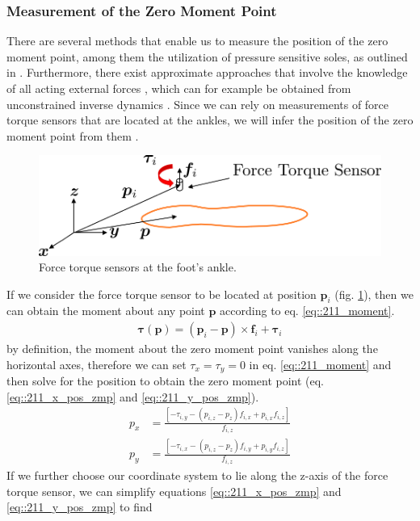 \subsubsection{Measurement of the Zero Moment Point}
There are several methods that enable us to measure the position of the zero moment point, among them the utilization of pressure sensitive soles, as outlined in \cite{kajita2014introduction}. Furthermore, there exist approximate approaches that involve the knowledge of all acting external forces \cite{huang2001planning}, which can for example be obtained from unconstrained inverse dynamics \cite{michel2017dynamic}. Since we can rely on measurements of force torque sensors that are located at the ankles, we will infer the position of the zero moment point from them \cite{kajita2014introduction}. 
\begin{figure}[h!]
	\centering
	\includegraphics[scale=.5]{chapters/02_background/img/ft_sensor.png}
	\caption{Force torque sensors at the foot's ankle.}
	\label{fig::211_force_torque}
\end{figure}
If we consider the force torque sensor to be located at position $\bm{p}_i$ (fig. \ref{fig::211_force_torque}), then we can obtain the moment about any point $\bm{p}$ according to eq. \ref{eq::211_moment}.
\begin{align}
	\bm{\tau}(\bm{p}) = (\bm{p}_i-\bm{p})\times \bm{f}_i + \bm{\tau}_i
	\label{eq::211_moment}
\end{align}
by definition, the moment about the zero moment point vanishes along the horizontal axes, therefore we can set $\tau_x = \tau_y = 0$ in eq. \ref{eq::211_moment} and then solve for the position to obtain the zero moment point (eq. \ref{eq::211_x_pos_zmp} and \ref{eq::211_y_pos_zmp}).
\begin{align}
	p_x &= \frac{\left[-\tau_{i,y}-(p_{i,z}-p_z)f_{i,x}+p_{i,x}f_{i,z}\right]}{f_{i,z}}
	\label{eq::211_x_pos_zmp}\\
	p_y &= \frac{\left[-\tau_{i,x}-(p_{i,z}-p_z)f_{i,y}+p_{i,y}f_{i,z}\right]}{f_{i,z}}
	\label{eq::211_y_pos_zmp}
\end{align}
If we further choose our coordinate system to lie along the z-axis of the force torque sensor, we can simplify equations \ref{eq::211_x_pos_zmp} and \ref{eq::211_y_pos_zmp} to find
